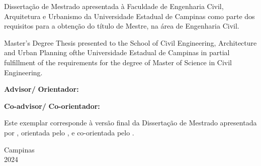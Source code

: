 \def\titlepage{
    \large\bf
    \vfill
    \begin{center}
        \@author
        \vfill
            \@title
            \vskip 8mm
        \titulo
    \end{center}
    \vfill
    \normalfont
    \normalsize
    \hfill\begin{minipage}[t]{0.54\textwidth}
        Disserta\c{c}\~{a}o de Mestrado apresentada \`{a} Faculdade de Engenharia Civil, Arquitetura e Urbanismo da Universidade Estadual de Campinas como parte dos requisitos para a obten\c{c}\~{a}o do t\'{i}tulo de Mestre, na área de Engenharia Civil.
    \end{minipage}
        \vskip 8mm
        \hfill\begin{minipage}[t]{0.54\textwidth}
            Master's Degree Thesis presented to the School of Civil Engineering, Architecture and Urban Planning ofthe Universidade Estadual de Campinas in partial fulfillment of the requirements for the degree of Master of Science in Civil Engineering.
        \end{minipage}
    \vfill
        {\bf Advisor/}\hspace{-0.9ex}
        {\bf Orientador: \advisor}

        {\bf Co-advisor/}\hspace{-0.7ex}
        {\bf Co-orientador: \coadvisor}
    \vfill
        \begin{minipage}[t]{0.5\textwidth}
            Este exemplar corresponde \`{a} vers\~{a}o final da Disserta\c{c}\~{a}o de Mestrado apresentada por \@author, orientada pelo \advisor \xspace, e co-orientada pelo \coadvisor.
        \end{minipage}
    \vfill
    \begin{center}
        \large
        Campinas\\ 2024
    \end{center}
}

\titlepage